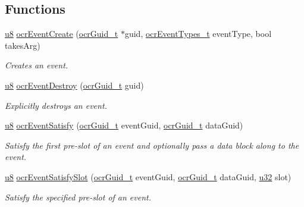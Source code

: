 \subsection*{Functions}
\begin{DoxyCompactItemize}
\item 
\hyperlink{group__OCRTypesGeneral_ga92c50087ca0e64fa93fc59402c55f8ca}{u8} \hyperlink{group__OCREvents_gab4cd41f97cc692a86f887b404b055066}
{ocr\-Event\-Create} (\hyperlink{group__OCRTypesGeneral_gacde3883d1ce245c051133c2c3aa82fc8}{ocr\-Guid\-\_\-t} $\ast$guid, \hyperlink{group__OCRTypesEvents_ga42f4195355182edfaa79c9ef3f2c07b1}{ocr\-Event\-Types\-\_\-t} event\-Type, bool takes\-Arg)
\begin{DoxyCompactList}\small\item\em Creates an event. \end{DoxyCompactList}

\item 
\hyperlink{group__OCRTypesGeneral_ga92c50087ca0e64fa93fc59402c55f8ca}{u8} \hyperlink{group__OCREvents_ga24d30531aaa059c1086fc74712d4f23d}
{ocr\-Event\-Destroy} (\hyperlink{group__OCRTypesGeneral_gacde3883d1ce245c051133c2c3aa82fc8}{ocr\-Guid\-\_\-t} guid)
\begin{DoxyCompactList}\small\item\em Explicitly destroys an event. \end{DoxyCompactList}

\item 
\hyperlink{group__OCRTypesGeneral_ga92c50087ca0e64fa93fc59402c55f8ca}{u8} \hyperlink{group__OCREvents_gab27ef5d905c01ba534e86f8e7e91eaf0}
{ocr\-Event\-Satisfy} (\hyperlink{group__OCRTypesGeneral_gacde3883d1ce245c051133c2c3aa82fc8}{ocr\-Guid\-\_\-t} event\-Guid, \hyperlink{group__OCRTypesGeneral_gacde3883d1ce245c051133c2c3aa82fc8}{ocr\-Guid\-\_\-t} data\-Guid)
\begin{DoxyCompactList}\small\item\em Satisfy the first pre-\/slot of an event and optionally pass a data block along to the event. \end{DoxyCompactList}

\item 
\hyperlink{group__OCRTypesGeneral_ga92c50087ca0e64fa93fc59402c55f8ca}{u8} \hyperlink{group__OCREvents_gab53103ecf0c74b55830edf5b8d14a942}
{ocr\-Event\-Satisfy\-Slot} (\hyperlink{group__OCRTypesGeneral_gacde3883d1ce245c051133c2c3aa82fc8}{ocr\-Guid\-\_\-t} event\-Guid, \hyperlink{group__OCRTypesGeneral_gacde3883d1ce245c051133c2c3aa82fc8}{ocr\-Guid\-\_\-t} data\-Guid, \hyperlink{group__OCRTypesGeneral_gafaa62991928fb9fb18ff0db62a040aba}{u32} slot)
\begin{DoxyCompactList}\small\item\em Satisfy the specified pre-\/slot of an event. \end{DoxyCompactList}
\end{DoxyCompactItemize}


